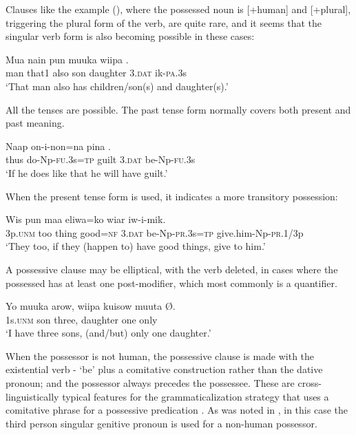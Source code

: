 Clauses like the example (), where the possessed noun is [+human] and [+plural], triggering the plural form of the verb, are quite rare, and it seems that the singular verb form is also becoming possible in these cases:

\ea%
\label{ex:x1321}
\gll Mua  nain  pun  muuka  wiipa   . \\
     man  that1  also  son  daughter  3.\textsc{dat}  ik-\textsc{pa}.3s \\
\glt `That man also has children/son(s) and daughter(s).'
\z

All the tenses are possible. The past tense form normally covers both present and past meaning.

\ea%
\label{ex:x1066}
\gll Naap  on-i-non=na  pina   . \\
     thus  do-Np-\textsc{fu}.3s=\textsc{tp}  guilt  3.\textsc{dat}  be-Np-\textsc{fu}.3s \\
\glt `If he does like that he will have guilt.'
\z

When the present tense form is used, it indicates a more transitory possession:

\ea%
\label{ex:x1201}
\gll Wis  pun  maa  eliwa=ko  wiar   iw-i-mik. \\
     3p.\textsc{unm}  too  thing  good=\textsc{nf}  3.\textsc{dat}  be-Np-\textsc{pr}.3s=\textsc{tp} give.him-Np-\textsc{pr}.1/3p \\
\glt `They too, if they (happen to) have good things, give to him.'
\z

A possessive clause may be elliptical, with the verb deleted, in cases where the possessed  has at least one post-modifier, which most commonly is a quantifier.

\ea%
\label{ex:x1322}
\gll Yo  muuka  arow,  wiipa  kuisow  muuta  {\O}. \\
     1s.\textsc{unm}  son  three,  daughter  one  only \\
\glt `I have three sons, (and/but) only one daughter.'
\z

When the possessor is not human, the possessive clause is made with the existential verb - `be' plus a comitative construction rather than the dative pronoun; and the possessor always precedes the possessee. These are cross-linguistically typical features for the grammaticalization strategy that uses a comitative phrase for a possessive predication \citep[53--57]{Heine1997}. As was noted in , in this case the third person singular genitive pronoun  is used for a non-human possessor.


